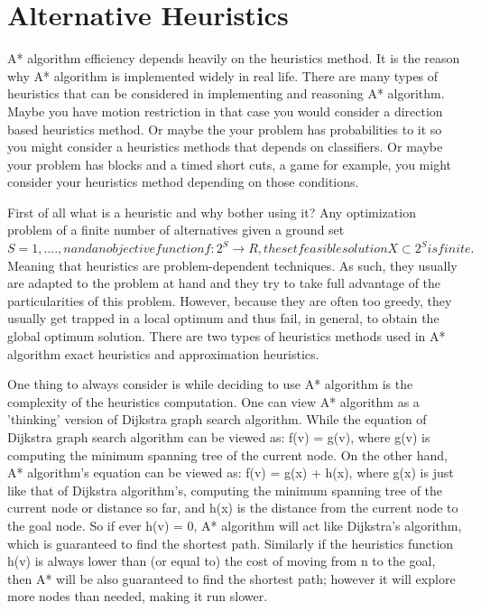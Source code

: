 \documentclass[12pt]{article}
\begin{document}
\section{Alternative Heuristics}
\label{sec:alternativeHeuristics}
A* algorithm efficiency depends heavily on the heuristics method. It is the reason why A* algorithm is implemented widely in real life. There are many types of heuristics that can be considered in implementing and reasoning A* algorithm. Maybe you have motion restriction in that case you would consider a direction based heuristics method. Or maybe the your problem has probabilities to it so you might consider a heuristics methods that depends on classifiers. Or maybe your problem has blocks and a timed short cuts, a game for example, you might consider your heuristics method depending on those conditions.

First of all what is a heuristic and why bother using it? Any optimization problem of a finite number of alternatives given a ground set \begin{math} S = {1,....,n} and an objective function f : 2^S \rightarrow R, the set feasible solution X \subset 2^S is finite.\end{math} Meaning that heuristics are problem-dependent techniques. As such, they usually are adapted to the problem at hand and they try to take full advantage of the particularities of this problem. However, because they are often too greedy, they usually get trapped in a local optimum and thus fail, in general, to obtain the global optimum solution. There are two types of heuristics methods used in A* algorithm exact heuristics and approximation heuristics.

One thing to always consider is while deciding to use A* algorithm is the complexity of the heuristics computation. One can view A* algorithm as a 'thinking' version of Dijkstra graph search algorithm. While the equation of Dijkstra graph search algorithm can be viewed as:  f(v) = g(v), where g(v) is computing the minimum spanning tree of the current node. On the other hand, A* algorithm's equation can be viewed as: f(v) = g(x) + h(x), where g(x) is just like that of Dijkstra algorithm's, computing the minimum spanning tree of the current node or distance so far, and h(x) is the distance from the current node to the goal node. So if ever h(v) = 0, A* algorithm will act like Dijkstra's algorithm, which is guaranteed to find the shortest path. Similarly if the heuristics function h(v) is always lower than (or equal to) the cost of moving from n to the goal, then A* will be also guaranteed to find the shortest path; however it will explore more nodes than needed, making it run slower.
\end{document}
